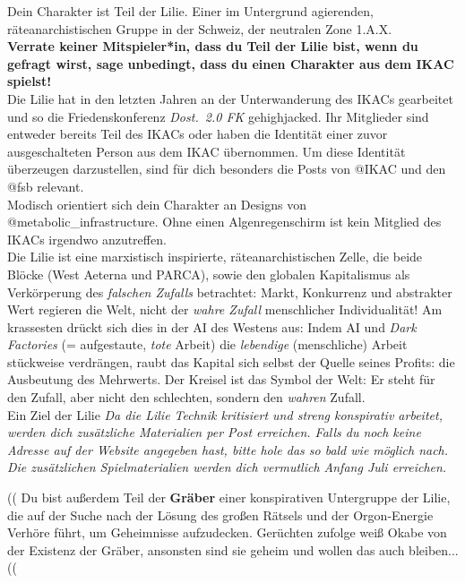 Dein Charakter ist Teil der Lilie. Einer im Untergrund agierenden,
räteanarchistischen Gruppe in der Schweiz, der neutralen Zone 1.A.X. \\
\textbf{Verrate keiner Mitspieler*in, dass du Teil der Lilie bist, wenn du
gefragt wirst, sage unbedingt, dass du einen Charakter aus dem IKAC spielst!}\\
Die Lilie hat in den letzten Jahren an der Unterwanderung des IKACs gearbeitet
und so die Friedenskonferenz \emph{Dost.~2.0 FK} gehighjacked. Ihr Mitglieder
sind entweder bereits Teil des IKACs oder haben die Identität einer zuvor
ausgeschalteten Person aus dem IKAC übernommen. Um diese Identität überzeugen
darzustellen, sind für dich besonders die Posts von @IKAC und den @fsb
relevant.\\
Modisch orientiert sich dein Charakter an Designs von
@metabolic\_infrastructure. Ohne einen Algenregenschirm ist kein Mitglied des
IKACs irgendwo anzutreffen.\\ 
Die Lilie ist eine marxistisch inspirierte, räteanarchistischen Zelle, die beide
Blöcke (West Aeterna und PARCA), sowie den globalen Kapitalismus als Verkörperung des
\emph{falschen Zufalls} betrachtet: Markt, Konkurrenz und abstrakter Wert
regieren die Welt, nicht der \emph{wahre Zufall} menschlicher Individualität! Am
krassesten drückt sich dies in der AI des Westens aus: Indem AI und
\emph{Dark Factories} (= aufgestaute, \emph{tote} Arbeit) die \emph{lebendige}
(menschliche) Arbeit stückweise verdrängen, raubt das Kapital sich selbst der
Quelle seines Profits: die Ausbeutung des Mehrwerts. 
Der Kreisel ist das Symbol der Welt: Er steht für den Zufall, aber nicht den
schlechten, sondern den \emph{wahren} Zufall.\\
Ein Ziel der Lilie 
\emph{Da die Lilie Technik kritisiert und streng konspirativ arbeitet, werden dich
zusätzliche Materialien per Post erreichen. Falls du noch keine Adresse auf der
Website angegeben hast, bitte hole das so bald wie möglich nach. Die zusätzlichen
Spielmaterialien werden dich vermutlich Anfang Juli erreichen.}

((%
  Du bist außerdem Teil der \textbf{Gräber} einer konspirativen Untergruppe der
  Lilie, die auf der Suche nach der Lösung des großen Rätsels und der
  Orgon-Energie Verhöre führt, um Geheimnisse aufzudecken. Gerüchten zufolge
  weiß Okabe von der Existenz der Gräber, ansonsten sind sie geheim und wollen
  das auch bleiben... 
((%
